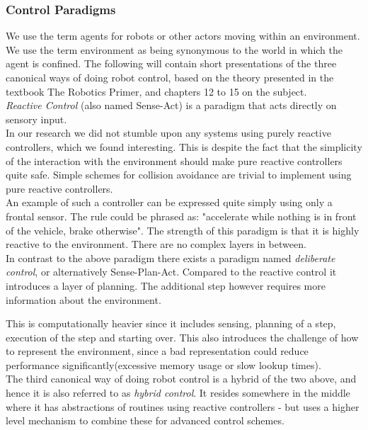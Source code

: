 \subsubsection{Control Paradigms}
We use the term agents for robots or other actors moving within an environment.\\
We use the term environment as being synonymous to the world in which the agent is confined.
The following will contain short presentations of the three canonical ways of doing robot control, based on the theory presented in the textbook The Robotics Primer\citep{book:mataric}, and chapters 12 to 15 on the subject.\\

\textit{Reactive Control} (also named Sense-Act) is a paradigm that acts directly on sensory input.\\
In our research we did not stumble upon any systems using purely reactive controllers, which we found interesting. This is despite the fact that the simplicity of the interaction with the environment should make pure reactive controllers quite safe.
Simple schemes for collision avoidance are trivial to implement using pure reactive controllers.\\
An example of such a controller can be expressed quite simply using only a frontal sensor. The rule could be phrased as: "accelerate while nothing is in front of the vehicle, brake otherwise".
The strength of this paradigm is that it is highly reactive to the environment. There are no complex layers in between.\\

In contrast to the above paradigm there exists a paradigm named \textit{deliberate control}, or alternatively Sense-Plan-Act.
Compared to the reactive control it introduces a layer of planning.
The additional step however requires more information about the environment.

This is computationally heavier since it includes sensing, planning of a step, execution of the step and starting over.
This also introduces the challenge of how to represent the environment, since a bad representation could reduce performance significantly(excessive memory usage or slow lookup times).\\

The third canonical way of doing robot control is a hybrid of the two above, and hence it is also referred to as \textit{hybrid control}.
It resides somewhere in the middle where it has abstractions of routines using reactive controllers - but uses a higher level mechanism to combine these for advanced control schemes.\\

